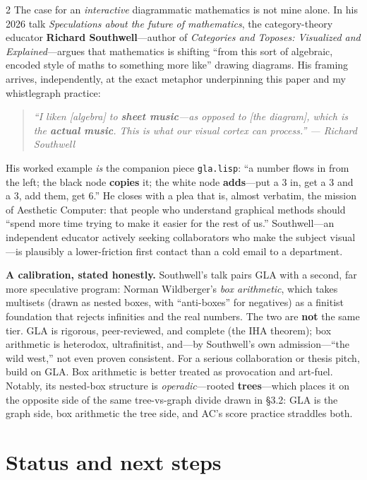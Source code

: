 \documentclass[11pt, letterpaper]{article}
\begin{document}
\begin{multicols}{2}
The case for an \emph{interactive} diagrammatic mathematics is not mine
alone. In his 2026 talk \emph{Speculations about the future of
mathematics}, the category-theory educator \textbf{Richard
Southwell}---author of \emph{Categories and Toposes: Visualized and
Explained}---argues that mathematics is shifting ``from this sort of
algebraic, encoded style of maths to something more like'' drawing
diagrams. His framing arrives, independently, at the exact metaphor
underpinning this paper and my whistlegraph practice:

\begin{quote}
\itshape ``I liken [algebra] to \textbf{sheet music}---as opposed to [the
diagram], which is the \textbf{actual music}. This is what our visual
cortex can process.'' --- Richard Southwell
\end{quote}

His worked example \emph{is} the companion piece \texttt{gla.lisp}: ``a
number flows in from the left; the black node \textbf{copies} it; the
white node \textbf{adds}---put a 3 in, get a 3 and a 3, add them, get 6.''
He closes with a plea that is, almost verbatim, the mission of Aesthetic
Computer: that people who understand graphical methods should ``spend more
time trying to make it easier for the rest of us.'' Southwell---an
independent educator actively seeking collaborators who make the subject
visual---is plausibly a lower-friction first contact than a cold email to
a department.

\textbf{A calibration, stated honestly.} Southwell's talk pairs GLA with a
second, far more speculative program: Norman Wildberger's \emph{box
arithmetic}, which takes multisets (drawn as nested boxes, with
``anti-boxes'' for negatives) as a finitist foundation that rejects
infinities and the real numbers. The two are \textbf{not} the same tier.
GLA is rigorous, peer-reviewed, and complete (the IHA theorem); box
arithmetic is heterodox, ultrafinitist, and---by Southwell's own
admission---``the wild west,'' not even proven consistent. For a serious
collaboration or thesis pitch, build on GLA. Box arithmetic is better
treated as provocation and art-fuel. Notably, its nested-box structure is
\emph{operadic}---rooted \textbf{trees}---which places it on the opposite
side of the same tree-vs-graph divide drawn in \S3.2: GLA is the graph
side, box arithmetic the tree side, and AC's score practice straddles
both.

\section{Status and next steps}


\end{multicols}
\end{document}
